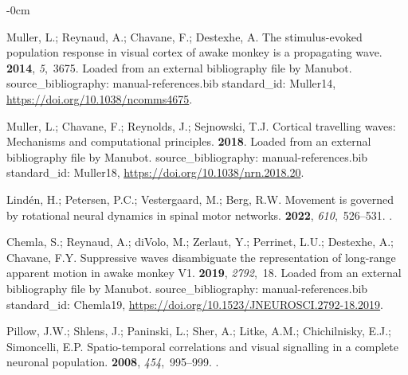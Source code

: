 \documentclass[brainsci, %
               review,submit,pdftex,moreauthors
               ]{Definitions/mdpi}
\begin{document}
\begin{adjustwidth}{-\extralength}{0cm}
\begin{thebibliography}{999}
  Muller, L.; Reynaud, A.; Chavane, F.; Destexhe, A.
  \newblock The stimulus-evoked population response in visual cortex of awake
    monkey is a propagating wave.
   {\bf 2014}, {\em 5},~3675.
   Loaded from an external bibliography file by Manubot.
    source\_bibliography: manual-references.bib standard\_id: Muller14,
    {\url{https://doi.org/10.1038/ncomms4675}}.
  
  Muller, L.; Chavane, F.; Reynolds, J.; Sejnowski, T.J.
  \newblock Cortical travelling waves: {Mechanisms} and computational principles.
   {\bf 2018}.
  \newblock Loaded from an external bibliography file by Manubot.
    source\_bibliography: manual-references.bib standard\_id: Muller18,
    {\url{https://doi.org/10.1038/nrn.2018.20}}.
  
  Lindén, H.; Petersen, P.C.; Vestergaard, M.; Berg, R.W.
  \newblock Movement is governed by rotational neural dynamics in spinal motor
    networks.
   {\bf 2022}, {\em 610},~526--531.
  .
  
  Chemla, S.; Reynaud, A.; diVolo, M.; Zerlaut, Y.; Perrinet, L.U.; Destexhe, A.;
    Chavane, F.Y.
  \newblock Suppressive waves disambiguate the representation of long-range
    apparent motion in awake monkey {V1}.
   {\bf 2019}, {\em 2792},~18.
  \newblock Loaded from an external bibliography file by Manubot.
    source\_bibliography: manual-references.bib standard\_id: Chemla19,
    {\url{https://doi.org/10.1523/JNEUROSCI.2792-18.2019}}.
  
  Pillow, J.W.; Shlens, J.; Paninski, L.; Sher, A.; Litke, A.M.; Chichilnisky,
    E.J.; Simoncelli, E.P.
  \newblock Spatio-temporal correlations and visual signalling in a complete
    neuronal population.
   {\bf 2008}, {\em 454},~995--999.
  .
  

\end{thebibliography}
\end{adjustwidth}
\end{document}
